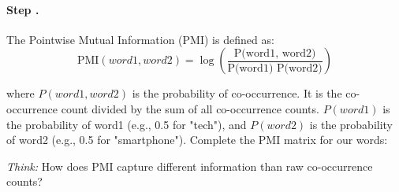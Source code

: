 \documentclass[a4paper,14pt]{extarticle}
\newcounter{exercisecount}
\newcounter{stepcount}[exercisecount]
\newcommand{\step}{\stepcounter{stepcount}\paragraph{Step \theexercisecount.\thestepcount}}
\newcommand{\think}[1]{
    \begin{mdframed}[backgroundcolor=thinkcolor,linewidth=0.5pt]
    \textit{Think:} #1
    \end{mdframed}}
\begin{document}
\step The Pointwise Mutual Information (PMI) is defined as:
\[ \text{PMI}(word1, word2) = \log\left(\frac{\text{P(word1, word2)}}{\text{P(word1) P(word2)}}\right) \]

where $P(word1, word2)$ is the probability of co-occurrence. It is the co-occurrence count divided by the sum of all co-occurrence counts. $P(word1)$ is the probability of word1 (e.g., 0.5 for "tech"), and $P(word2)$ is the probability of word2 (e.g., 0.5 for "smartphone"). Complete the PMI matrix for our words:
\begin{center}
\end{center}

\think{How does PMI capture different information than raw co-occurrence counts?}
\end{document}
